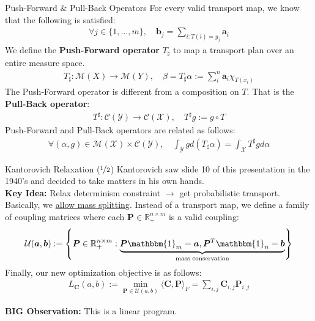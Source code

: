 \documentclass{beamer}
\begin{document}
\begin{frame}{Push-Forward \& Pull-Back Operators}
	For every valid transport map, we know that the following is satisfied:
	\begin{gather}
		\forall j \in \{1, \ldots, m\}, \quad \bm{b}_j = \sum_{i : T(i) = y_j} \bm{a}_i
	\end{gather} \pause
	We define the \textbf{Push-Forward operator} $T_\sharp$ to map a transport plan over an entire measure space.
	\begin{gather}
		T_\sharp: \mathcal{M}(X) \rightarrow \mathcal{M}(Y), \quad \beta = T_\sharp \alpha := \sum_i^n \bm{a}_i \chi_{T(x_i)}
	\end{gather} \pause
	The Push-Forward operator is different from a composition on $T$. That is the \textbf{Pull-Back operator}:
	\begin{gather}
		T^\sharp: \mathcal{C}(\mathcal{Y}) \rightarrow \mathcal{C}(\mathcal{X}), \quad T^\sharp g := g \circ T
	\end{gather} \pause
	Push-Forward and Pull-Back operators are related as follows:
	\begin{gather}
		\forall (\alpha, g) \in \mathcal{M}(\mathcal{X}) \times \mathcal{C}(\mathcal{Y}), \quad \int_\mathcal{Y} g d (T_\sharp \alpha) = \int_{\mathcal{X}} T^\sharp g d \alpha
	\end{gather}
\end{frame}

\begin{frame}{Kantorovich Relaxation ($\nicefrac{1}{2}$)}
	Kantorovich saw slide 10 of this presentation in the 1940's and decided to take matters in his own hands. \pause \newline \\

	\textbf{Key Idea:} Relax determinism constraint $\rightarrow$ get probabilistic transport. \pause \newline \\

	Basically, we \underline{allow mass splitting}. \pause Instead of a transport map, we define a family of coupling matrices where each $\bm{P} \in \mathbb{R}^{n \times m}_+$ is a valid coupling:
	\begin{gather}
		\mathcal{U}(\bm{a}, \bm{b}) := \left\{ \bm{P} \in \mathbb{R}^{n \times m}_+ : \underbrace{\bm{P} \mathbbm{1}_m = \bm{a}, \bm{P}^T \mathbbm{1}_n = \bm{b}}_{\text{mass conservation}} \right\}
	\end{gather} \pause
	Finally, our new optimization objective is as follows:
	\begin{gather}
		L_{\bm{C}}(a, b) := \min_{\bm{P} \in \mathcal{U}(a, b)} \langle \bm{C}, \bm{P} \rangle_F = \sum_{i, j} \bm{C}_{i,j} \bm{P}_{i, j}
	\end{gather} \pause

	\textbf{BIG Observation:} This is a linear program.
\end{frame}
\end{document}
